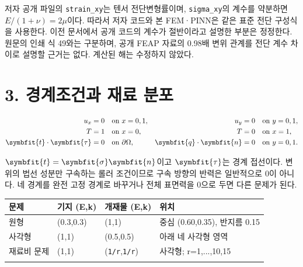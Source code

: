 \documentclass[10pt,a4paper]{article}
\renewcommand{\boldsymbol}[1]{\symbfit{#1}}
\begin{document}
저자 공개 파일의 \nolinkurl{strain_xy}는 텐서 전단변형률이며, \nolinkurl{sigma_xy}의 계수를 약분하면 $E/(1+\nu)=2\mu$이다. 따라서 저자 코드와 본 FEM·PINN은 같은 표준 전단 구성식을 사용한다. 이전 문서에서 공개 코드의 계수가 절반이라고 설명한 부분은 정정한다. 원문의 인쇄 식 49와는 구분하며, 공개 FEAP 자료의 0.98배 변위 관계를 전단 계수 차이로 설명할 근거는 없다. 계산된 해는 수정하지 않았다.\par

\clearpage

\section{3. 경계조건과 재료 분포}

\begin{equation}\begin{aligned}u_x&=0 &&\text{on }x=0,1,& u_y&=0 &&\text{on }y=0,1,\\ T&=1 &&\text{on }x=0,& T&=0 &&\text{on }x=1,\\\boldsymbol t\cdot\boldsymbol\tau&=0 &&\text{on }\partial\Omega,&\boldsymbol q\cdot\boldsymbol n&=0 &&\text{on }y=0,1.\end{aligned}\end{equation}

$\boldsymbol t=\boldsymbol\sigma\boldsymbol n$이고 $\boldsymbol\tau$는 경계 접선이다. 변위의 법선 성분만 구속하는 롤러 조건이므로 구속 방향의 반력은 일반적으로 0이 아니다. 네 경계를 완전 고정 경계로 바꾸거나 전체 표면력을 0으로 두면 다른 문제가 된다.\par

\begingroup\small

\par\begin{minipage}{\linewidth}\begin{tabular}{>{\raggedright\arraybackslash}p{}>{\raggedright\arraybackslash}p{}>{\raggedright\arraybackslash}p{}>{\raggedright\arraybackslash}p{}}

\rowcolor{tint} \textbf{문제} & \textbf{기지 (E,k)} & \textbf{개재물 (E,k)} & \textbf{위치}\\\midrule

원형 & (0.3,0.3) & (1,1) & 중심 (0.60,0.35), 반지름 0.15\\\addlinespace[2pt]

사각형 & (1,1) & (0.5,0.5) & 아래 네 사각형 영역\\\addlinespace[2pt]

재료비 문제 & (1,1) & (\nolinkurl{1/r},\nolinkurl{1/r}) & 사각형; r=1,...,10,15\\\addlinespace[2pt]

\bottomrule\end{tabular}\end{minipage}\par\vspace{5pt}\endgroup
\end{document}
